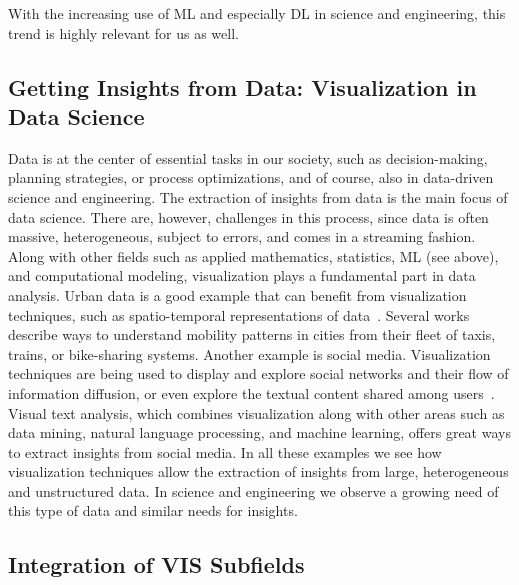\documentclass[10pt,journal,compsoc]{IEEEtran}
\begin{document}
With the increasing use of ML and especially DL in science and engineering, this trend is highly relevant for us as well.


\subsection{Getting Insights from Data: Visualization in Data Science}

Data is at the center of essential tasks in our society, such as decision-making, planning strategies, or process optimizations, and of course, also in data-driven science and engineering. The extraction of insights from data is the main focus of data science. There are, however, challenges in this process, since data is often massive, heterogeneous, subject to errors, and comes in a streaming fashion. Along with other fields such as applied mathematics, statistics, ML (see above), and computational modeling, visualization plays a fundamental part in data analysis. Urban data is a good example that can benefit from visualization techniques, such as spatio-temporal representations of data~\cite{Doraiswamy2018}. Several works describe ways to understand mobility patterns in cities from their fleet of taxis, trains, or bike-sharing systems. 
Another example is social media. Visualization techniques are being used to display and explore social networks and their flow of information diffusion, or even explore the textual content shared among users~\cite{Chen2017}. Visual text analysis, which combines visualization along with other areas such as data mining, natural language processing, and machine learning, offers great ways to extract insights from social media. In all these examples we see how visualization techniques allow the extraction of insights from large, heterogeneous and unstructured data. In science and engineering we observe a growing need of this type of data and similar needs for insights. 


\subsection{Integration of VIS Subfields}
\end{document}
